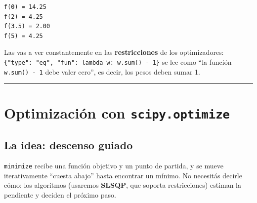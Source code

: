 \documentclass[
  spanish,
  letterpaper,
  DIV=11,
  numbers=noendperiod]{scrreprt}
\begin{document}
\begin{verbatim}
f(0) = 14.25
f(2) = 4.25
f(3.5) = 2.00
f(5) = 4.25
\end{verbatim}

Las vas a ver constantemente en las \textbf{restricciones} de los
optimizadores:
\texttt{\{"type":\ "eq",\ "fun":\ lambda\ w:\ w.sum()\ -\ 1\}} se lee
como ``la función \texttt{w.sum()\ -\ 1} debe valer cero'', es decir,
los pesos deben sumar 1.

\begin{center}\rule{0.5\linewidth}{0.5pt}\end{center}

\chapter{\texorpdfstring{Optimización con
\texttt{scipy.optimize}}{Optimización con scipy.optimize}}\label{optimizaciuxf3n-con-scipy.optimize}

\section{La idea: descenso guiado}\label{la-idea-descenso-guiado}

\texttt{minimize} recibe una función objetivo y un punto de partida, y
se mueve iterativamente ``cuesta abajo'' hasta encontrar un mínimo. No
necesitás decirle cómo: los algoritmos (usaremos \textbf{SLSQP}, que
soporta restricciones) estiman la pendiente y deciden el próximo paso.
\end{document}
